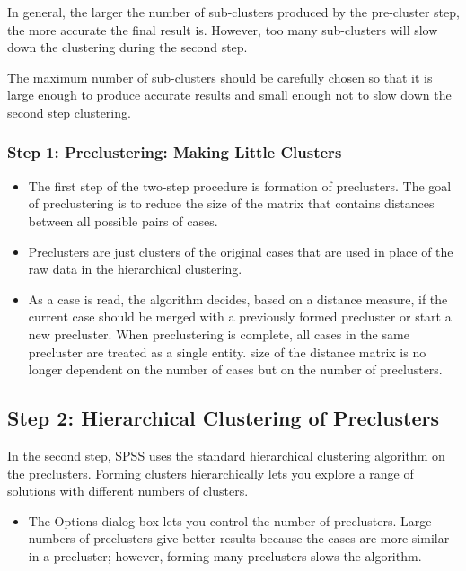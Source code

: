 \documentclass[a4paper,12pt]{article}
\begin{document}
In general, the larger the number of sub-clusters produced by the pre-cluster step, the more accurate the final result is. However, too many sub-clusters will slow down the clustering during the second step.

The maximum number of sub-clusters should be carefully chosen so that it is large enough to produce accurate results and small enough not to slow down the second step clustering.




\subsubsection{Step 1: Preclustering: Making Little Clusters}
\begin{itemize}
    \item The first step of the two-step procedure is formation of preclusters. The goal of
preclustering is to reduce the size of the matrix that contains distances between all
possible pairs of cases.    \item Preclusters are just clusters of the original cases that are used
in place of the raw data in the hierarchical clustering.     \item As a case is read, the algorithm
decides, based on a distance measure, if the current case should be merged with a
previously formed precluster or start a new precluster. When preclustering is complete,
all cases in the same precluster are treated as a single entity.     \itemThe size of the distance
matrix is no longer dependent on the number of cases but on the number of preclusters.
\end{itemize}



\subsection{Step 2: Hierarchical Clustering of Preclusters}
In the second step, SPSS uses the standard hierarchical clustering algorithm on the
preclusters. Forming clusters hierarchically lets you explore a range of solutions with
different numbers of clusters.
\begin{itemize}
    \item The Options dialog box lets you control the number of preclusters. Large numbers
of preclusters give better results because the cases are more similar in a precluster;
however, forming many preclusters slows the algorithm.
\end{itemize}
\end{document}
